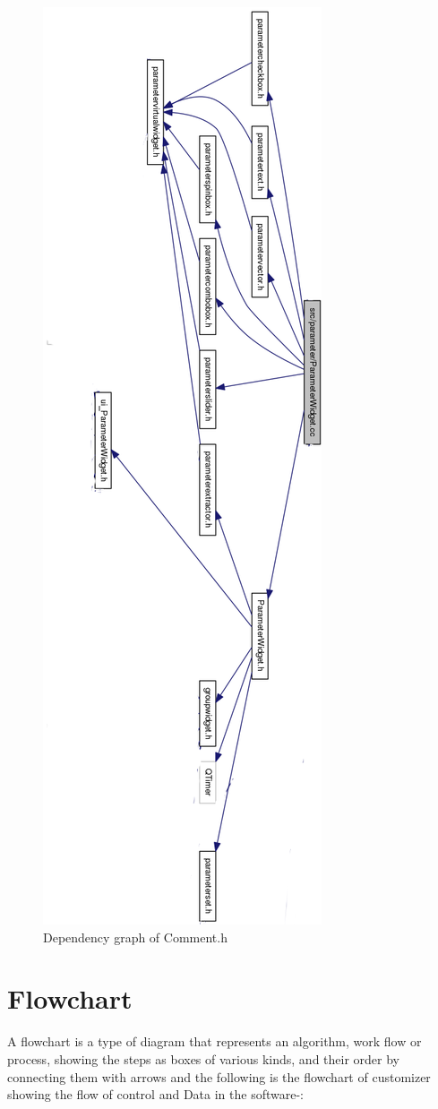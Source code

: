 \begin{figure}
\centering
\includegraphics[width=0.7\linewidth,height=1.37\columnwidth]{images/dependene}
\caption{ Dependency graph of Comment.h}
\label{fig:dependency}
\end{figure}


\section{Flowchart}
A flowchart is a type of diagram that represents an algorithm, work flow or process, showing the steps as boxes of various kinds, and their order by connecting them with arrows
and the following is the flowchart of customizer showing the flow of control and Data in the software-:

